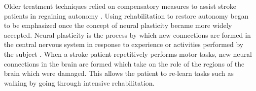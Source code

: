\documentclass[12pt]{report}
\begin{document}


Older treatment techniques relied on compensatory measures to assist stroke patients in regaining autonomy \cite{Dobkin2004}. Using rehabilitation to restore autonomy began to be emphasized once the concept of neural plasticity became more widely accepted. Neural plasticity is the process by which new connections are formed in the central nervous system in response to experience or activities performed by the subject \cite{Warraich2010}. When a stroke patient repetitively performs motor tasks, new neural connections in the brain are formed which take on the role of the regions of the brain which were damaged. This allows the patient to re-learn tasks such as walking by going through intensive rehabilitation. 
\end{document}
